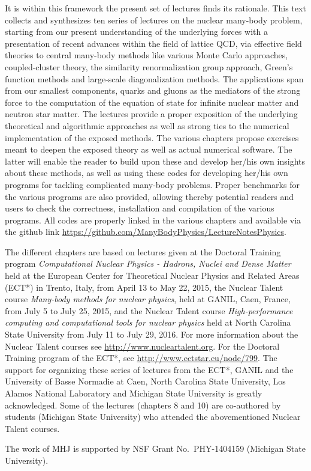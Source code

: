 It is within this framework the present set of lectures finds its rationale.
This text collects and synthesizes ten series of lectures on the
nuclear many-body problem, starting from our present understanding of
the underlying forces with a presentation of recent advances within
the field of lattice QCD, via effective field theories to central
many-body methods like various Monte Carlo approaches, coupled-cluster
theory, the similarity renormalization group approach, Green's
function methods and large-scale diagonalization methods.  The
applications span from our smallest components, quarks and gluons as
the mediators of the strong force to the computation of the equation
of state for infinite nuclear matter and neutron star matter.  The
lectures provide a proper exposition of the underlying theoretical and
algorithmic approaches as well as strong ties to the numerical
implementation of the exposed methods.  The various chapters propose
exercises meant to deepen the exposed theory as well as  actual numerical software.
The latter will enable the reader to build upon these and develop
her/his own insights about these methods, as well as using these codes
for developing her/his own programs for tackling complicated many-body
problems.  Proper benchmarks for the various programs are also provided, allowing thereby potential readers and users to check the 
correctness, installation and compilation  of the various programs. All codes are properly linked in the various chapters and available via the github link \url{https://github.com/ManyBodyPhysics/LectureNotesPhysics}. 


\begin{acknowledgement}
The different chapters are based on lectures given at the Doctoral Training program {\em Computational Nuclear Physics - Hadrons, Nuclei and Dense Matter} held at  the European Center for Theoretical Nuclear Physics
and Related Areas (ECT*) in Trento, Italy, from April 13 to May 22, 2015, the Nuclear Talent course {\em Many-body methods for nuclear physics}, held at GANIL, Caen, France, from July 5 to July 25,  2015, and the Nuclear Talent course {\em High-performance computing and computational tools for nuclear physics} held at North Carolina State University from July 11 to July 29, 2016. For more information about the Nuclear Talent courses see \url{http://www.nucleartalent.org}. For the Doctoral Training program of the ECT*, see \url{http://www.ectstar.eu/node/799}.
The support for organizing these series of lectures from the ECT*, GANIL and the University of Basse Normadie at Caen, North Carolina State University, Los Alamos National Laboratory and Michigan State University is greatly acknowledged.   Some of the lectures (chapters 8 and 10) are co-authored by students (Michigan State University) who  attended the abovementioned Nuclear Talent courses.


The work of MHJ is supported by NSF Grant No.~PHY-1404159 (Michigan State University). 
\end{acknowledgement}

